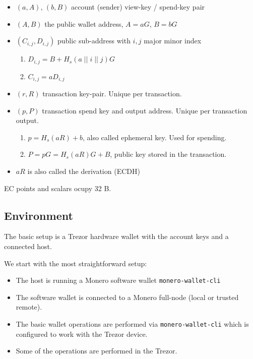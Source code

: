 \documentclass[]{article}
\begin{document}
\begin{itemize}
	\item $(a, A)$, $(b, B)$ account (sender) view-key / spend-key pair
	\item $(A, B)$ the public wallet address, $A=aG$, $B=bG$
	\item $(C_{i,j}, D_{i,j})$ public sub-address with $i, j$ major minor index
	\begin{enumerate}
		\item $D_{i,j} = B + H_s(a \; || \; i \; || \; j)G$
		\item $C_{i,j} = aD_{i,j}$ 
	\end{enumerate}
	\item $(r, R)$ transaction key-pair. Unique per transaction. 
	\item $(p, P)$ transaction spend key and output address. Unique per transaction output.
	\begin{enumerate}
		\item $p = H_s(aR) + b$, also called ephemeral key. Used for spending.
		\item $P = pG = H_s(aR)G + B$, public key stored in the transaction.
	\end{enumerate}
	\item $aR$ is also called the derivation (ECDH)
\end{itemize}

EC points and scalars ocupy 32 B.

\subsection{Environment}

The basic setup is a Trezor hardware wallet with the account keys and a connected host.

We start with the most straightforward setup:
\begin{itemize}
	\item The host is running a Monero software wallet \verb|monero-wallet-cli|
	
	\item  The software wallet is connected to a Monero full-node (local or trusted remote).
	
	\item The basic wallet operations are performed via \verb|monero-wallet-cli| which is configured to work with the Trezor device.
	
	\item Some of the operations are performed in the Trezor. 
\end{itemize}
\end{document}

